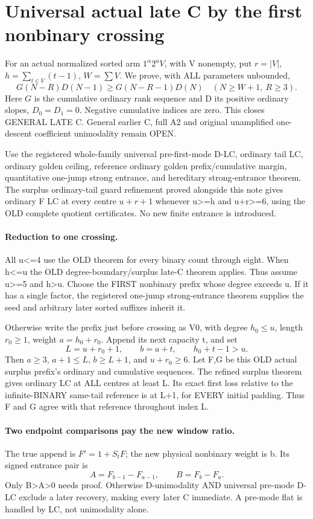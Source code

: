 \section{Universal actual late C by the first nonbinary crossing}
For an actual normalized sorted arm $1^\alpha2^uV$, with V nonempty,
put $r=|V|$, $h=\sum_{t\in V}(t-1)$, $W=\sum V$.
We prove, with ALL parameters unbounded,
\[
 G(N-R)D(N-1)\ge G(N-R-1)D(N)
              \quad(N\ge W+1,\ R\ge3).              \tag{1}
\]
Here $G$ is the cumulative ordinary rank sequence and D its positive
ordinary slopes, $D_0=D_1=0$. Negative cumulative indices are zero.
This closes GENERAL LATE C. General earlier C, full A2 and original
unamplified one-descent coefficient unimodality remain OPEN.

Use the registered whole-family universal pre-first-mode D-LC,
ordinary tail LC, ordinary golden ceiling, reference ordinary golden
prefix/cumulative margin, quantitative one-jump strong entrance,
and hereditary strong-entrance theorem.
The surplus ordinary-tail guard refinement proved alongside this
note gives ordinary F LC at every centre $u+r+1$ whenever u>=h
and u+r>=6, using the OLD complete quotient certificates.
No new finite entrance is introduced.

\paragraph{Reduction to one crossing.}
All u<=4 use the OLD theorem for every binary count through eight.
When h<=u the OLD degree-boundary/surplus late-C theorem applies.
Thus assume u>=5 and h>u. Choose the FIRST nonbinary prefix whose
degree exceeds u. If it has a single factor, the registered one-jump
strong-entrance theorem supplies the seed and arbitrary later sorted
suffixes inherit it.

Otherwise write the prefix just before crossing as V0, with degree
$h_0\le u$, length $r_0\ge1$, weight $a=h_0+r_0$.
Append its next capacity t, and set
\[
 L=u+r_0+1,\qquad b=a+t,\qquad h_0+t-1>u.
\]
Then $a\ge3$, $a+1\le L$, $b\ge L+1$, and $u+r_0\ge6$.
Let F,G be this OLD actual surplus prefix's ordinary and cumulative
sequences. The refined surplus theorem gives ordinary LC at ALL
centres at least L. Its exact first loss relative to the infinite-BINARY
same-tail reference is at L+1, for EVERY initial padding.
Thus F and G agree with that reference throughout index L.

\paragraph{Two endpoint comparisons pay the new window ratio.}
The true append is $F'=1+S_tF$; the new physical nonbinary weight is b.
Its signed entrance pair is
\[
 A=F_{b-1}-F_{a-1},\qquad B=F_b-F_a.
\]
Only B>A>0 needs proof. Otherwise D-unimodality AND universal
pre-mode D-LC exclude a later recovery, making every later C immediate.
A pre-mode flat is handled by LC, not unimodality alone.

